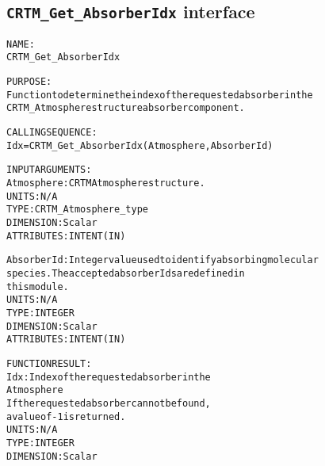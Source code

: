 \subsection{\texttt{CRTM\_Get\_AbsorberIdx} interface}
  \label{sec:CRTM_Get_AbsorberIdx_interface}
  \begin{alltt}
 
  NAME:
        CRTM_Get_AbsorberIdx
  
  PURPOSE:
        Function to determine the index of the requested absorber in the
        CRTM_Atmosphere structure absorber component.
 
  CALLING SEQUENCE:
        Idx = CRTM_Get_AbsorberIdx(Atmosphere, AbsorberId)
 
  INPUT ARGUMENTS:
        Atmosphere:   CRTM Atmosphere structure.
                      UNITS:      N/A
                      TYPE:       CRTM_Atmosphere_type
                      DIMENSION:  Scalar
                      ATTRIBUTES: INTENT(IN)
 
        AbsorberId:   Integer value used to identify absorbing molecular
                      species. The accepted absorber Ids are defined in
                      this module.
                      UNITS:      N/A
                      TYPE:       INTEGER
                      DIMENSION:  Scalar
                      ATTRIBUTES: INTENT(IN)
 
  FUNCTION RESULT:
        Idx:          Index of the requested absorber in the 
                      Atmosphere%Absorber array component.
                      If the requested absorber cannot be found, 
                      a value of -1 is returned.
                      UNITS:      N/A
                      TYPE:       INTEGER
                      DIMENSION:  Scalar
 
  \end{alltt}
